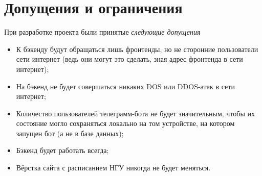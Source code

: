 \chapter{Допущения и ограничения}
	\label{chapter5}

	При разработке проекта были принятые \textit{следующие допущения}
	\begin{itemize}
		\item К бэкенду будут обращаться лишь фронтенды, но не сторонние пользователи сети интернет (ведь они могут это сделать, зная адрес фронтенда в сети интернет);
		
		\item На бэкенд не будет совершаться никаких DOS или DDOS-атак в сети интернет;
		
		\item Количество пользователей телеграмм-бота не будет значительным, чтобы их состояние могло сохраняться локально на том устройстве, на котором запущен бот (а не в базе данных);
		
		\item Бэкенд будет работать всегда;
		
		\item Вёрстка сайта с расписанием НГУ никогда не будет меняться.
	\end{itemize}
